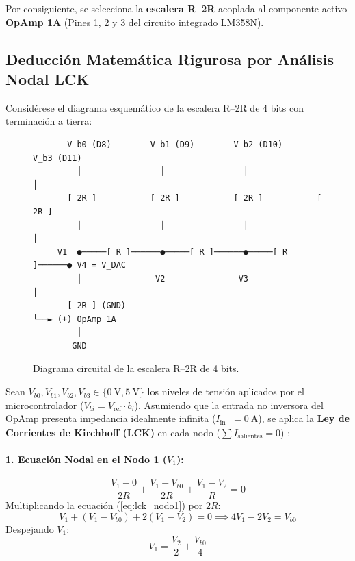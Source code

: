 \documentclass[11pt,letterpaper]{article}
\begin{document}
Por consiguiente, se selecciona la \textbf{escalera R--2R} acoplada al componente activo \textbf{OpAmp 1A} (Pines 1, 2 y 3 del circuito integrado LM358N).

\subsection{Deducción Matemática Rigurosa por Análisis Nodal LCK}
Considérese el diagrama esquemático de la escalera R--2R de 4 bits con terminación a tierra:

\begin{figure}[htbp]
\centering
\small
\begin{verbatim}
       V_b0 (D8)        V_b1 (D9)        V_b2 (D10)       V_b3 (D11)
         │                │                │                │
       [ 2R ]           [ 2R ]           [ 2R ]           [ 2R ]
         │                │                │                │
     V1  ●─────[ R ]──────●─────[ R ]──────●─────[ R ]──────● V4 = V_DAC
         │               V2               V3                │
       [ 2R ] (GND)                                         └──► (+) OpAmp 1A
         │
        GND
\end{verbatim}
\caption{Diagrama circuital de la escalera R--2R de 4 bits.}
\label{fig:diagrama_r2r}
\end{figure}

Sean $V_{b0}, V_{b1}, V_{b2}, V_{b3} \in \{\SI{0}{\volt}, \SI{5}{\volt}\}$ los niveles de tensión aplicados por el microcontrolador ($V_{bi} = V_{\text{ref}} \cdot b_i$). Asumiendo que la entrada no inversora del OpAmp presenta impedancia idealmente infinita ($I_{\text{in+}} = \SI{0}{\ampere}$), se aplica la \textbf{Ley de Corrientes de Kirchhoff (LCK)} en cada nodo ($\sum I_{\text{salientes}} = 0$) \cite{hayt2012,alexander2018}:

\paragraph{1. Ecuación Nodal en el Nodo 1 ($V_1$):}
\begin{equation}
\frac{V_1 - 0}{2R} + \frac{V_1 - V_{b0}}{2R} + \frac{V_1 - V_2}{R} = 0
\label{eq:lck_nodo1}
\end{equation}
Multiplicando la ecuación (\ref{eq:lck_nodo1}) por $2R$:
\begin{equation}
V_1 + (V_1 - V_{b0}) + 2(V_1 - V_2) = 0 \implies 4V_1 - 2V_2 = V_{b0}
\end{equation}
Despejando $V_1$:
\begin{equation}
V_1 = \frac{V_2}{2} + \frac{V_{b0}}{4} \label{eq:v1_despejado}
\end{equation}
\end{document}
